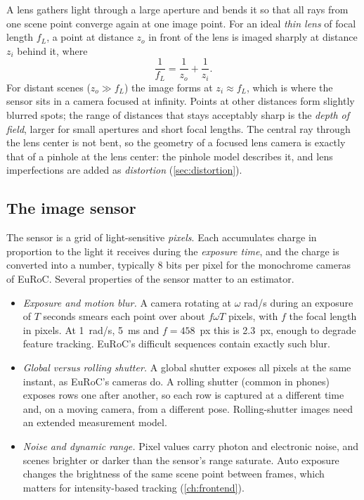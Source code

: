 A lens gathers light through a large aperture and bends it so that all rays from one scene point converge again at one image point. For an ideal
\emph{thin lens} of focal length $f_L$, a point at distance $z_o$ in front of the lens is imaged sharply at distance $z_i$ behind it, where
\begin{equation}
  \frac1{f_L} = \frac1{z_o} + \frac1{z_i} .
\end{equation}
For distant scenes ($z_o \gg f_L$) the image forms at $z_i \approx f_L$, which is where the sensor sits in a camera focused at infinity. Points at other
distances form slightly blurred spots; the range of distances that stays acceptably sharp is the \emph{depth of field}, larger for small apertures and
short focal lengths. The central ray through the lens center is not bent, so the geometry of a focused lens camera is exactly that of a pinhole at
the lens center: the pinhole model describes it, and lens imperfections are added as \emph{distortion} (\cref{sec:distortion}).

\subsection{The image sensor}

The sensor is a grid of light-sensitive \emph{pixels}. Each accumulates charge in proportion to the light it receives during the \emph{exposure time},
and the charge is converted into a number, typically 8 bits per pixel for the monochrome cameras of EuRoC. Several properties of the sensor matter to an
estimator.
\begin{itemize}
  \item \emph{Exposure and motion blur.} A camera rotating at $\omega$ rad/s during an exposure of $T$ seconds smears each point over about $f\omega T$ pixels, with
        $f$ the focal length in pixels. At 1~rad/s, 5~ms and $f = 458$~px this is 2.3~px, enough to degrade feature tracking. EuRoC's difficult
        sequences contain exactly such blur.
  \item \emph{Global versus rolling shutter.} A global shutter exposes all pixels at the same instant, as EuRoC's cameras do. A rolling shutter (common in
        phones) exposes rows one after another, so each row is captured at a different time and, on a moving camera, from a different pose. Rolling-shutter
        images need an extended measurement model.
  \item \emph{Noise and dynamic range.} Pixel values carry photon and electronic noise, and scenes brighter or darker than the sensor's range saturate. Auto
        exposure changes the brightness of the same scene point between frames, which matters for intensity-based tracking (\cref{ch:frontend}).
\end{itemize}

